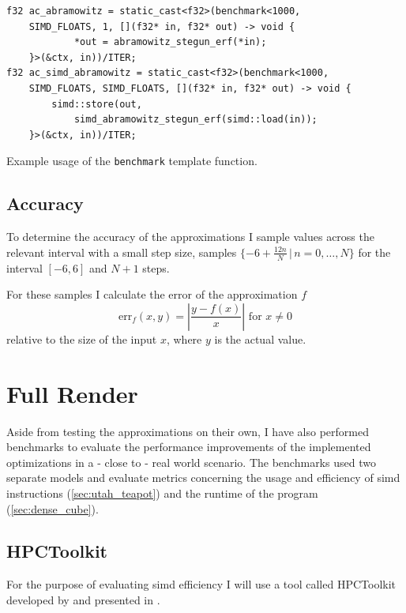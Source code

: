 \documentclass[a4paper, 11pt]{memoir}
\begin{document}
    \begin{listing}[t]
        \begin{verbatim}
f32 ac_abramowitz = static_cast<f32>(benchmark<1000,
    SIMD_FLOATS, 1, [](f32* in, f32* out) -> void {
            *out = abramowitz_stegun_erf(*in);
    }>(&ctx, in))/ITER;
f32 ac_simd_abramowitz = static_cast<f32>(benchmark<1000,
    SIMD_FLOATS, SIMD_FLOATS, [](f32* in, f32* out) -> void {
        simd::store(out,
            simd_abramowitz_stegun_erf(simd::load(in));
    }>(&ctx, in))/ITER;
        \end{verbatim}
        \caption{Example usage of the \texttt{benchmark} template function.}
        \label{lst:benchmark_example}
    \end{listing}

    \subsection{Accuracy}
    \label{sec:expr_accuracy}
    To determine the accuracy of the approximations I sample values across the relevant interval with a small step size,
    \eg samples $\{ -6 + \frac{12n}{N}\,|\, n=0,\dots,N \}$ for the interval $[-6, 6]$ and $N+1$ steps.

    For these samples I calculate the error of the approximation $f$
    \begin{equation}
        \text{err}_f(x, y) = \left|\frac{y - f(x)}{x}\right| \text{ for } x\ne0
    \end{equation}
    relative to the size of the input $x$, where $y$ is the actual value.

    \section{Full Render}
    \label{sec:expr_full_render}
    Aside from testing the approximations on their own, I have also performed benchmarks to evaluate the performance
    improvements of the implemented optimizations in a - close to - real world scenario. The benchmarks used two separate
    models and evaluate metrics concerning the usage and efficiency of \gls{simd} instructions (\ref{sec:utah_teapot})
    and the runtime of the program (\ref{sec:dense_cube}).

    \subsection{HPCToolkit}
    \label{sec:hpctoolkit}
    For the purpose of evaluating \gls{simd} efficiency I will use a tool called HPCToolkit developed by
    \citeauthor{hpc_toolkit} and presented in  \cite{hpc_toolkit}.
\end{document}
